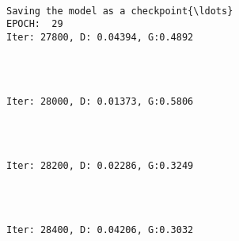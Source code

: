 \documentclass[11pt]{article}
\begin{document}
    \begin{Verbatim}[commandchars=\\\{\}]

Saving the model as a checkpoint{\ldots}
EPOCH:  29
Iter: 27800, D: 0.04394, G:0.4892
    \end{Verbatim}

    \begin{center}
    \end{center}
    { \hspace*{\fill} \\}
    
    \begin{Verbatim}[commandchars=\\\{\}]

Iter: 28000, D: 0.01373, G:0.5806
    \end{Verbatim}

    \begin{center}
    \end{center}
    { \hspace*{\fill} \\}
    
    \begin{Verbatim}[commandchars=\\\{\}]

Iter: 28200, D: 0.02286, G:0.3249
    \end{Verbatim}

    \begin{center}
    \end{center}
    { \hspace*{\fill} \\}
    
    \begin{Verbatim}[commandchars=\\\{\}]

Iter: 28400, D: 0.04206, G:0.3032
    \end{Verbatim}

    \begin{center}
    \end{center}
    { \hspace*{\fill} \\}
    
\end{document}
